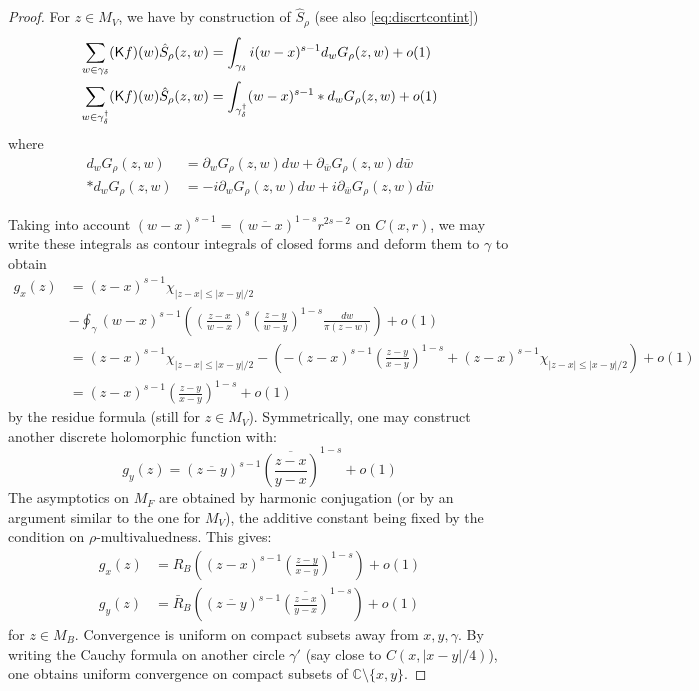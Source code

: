 \documentclass[10pt]{article}
\newcommand{\C}{\mathbb{C}}
\newcommand{\rK}{{\sf K}}
\newcommand{\dg}{\dagger}
\begin{document}
\begin{proof}
For $z\in M_V$, we have by construction of $\hat S_\rho$ (see also \eqref{eq:discrtcontint})
\begin{align*}
\sum_{w\in\gamma_\delta}(\rK f)(w)\hat S_\rho(z,w)
&=\int_{\gamma_\delta}i(w-x)^{s-1}d_wG_\rho(z,w)+o(1)\\
\sum_{w\in\gamma_\delta^\dg}(\rK f)(w)\hat S_\rho(z,w)
&=\int_{\gamma_\delta^\dg}(w-x)^{s-1}\ast d_wG_\rho(z,w)+o(1)
\end{align*}
where
\begin{align*}
d_wG_\rho(z,w)&=\partial_wG_\rho(z,w)dw+\partial_{\bar w}G_\rho(z,w)d\bar w\\
\ast d_wG_\rho(z,w)&=-i\partial_wG_\rho(z,w)dw+i\partial_{\bar w}G_\rho(z,w)d\bar w
\end{align*}

Taking into account $(w-x)^{s-1}=(\overline{w-x})^{1-s}r^{2s-2}$ on $C(x,r)$, we may write these integrals as contour integrals of closed forms and deform them to $\gamma$ to obtain
\begin{align*}
g_x(z)&=(z-x)^{s-1}\chi_{|z-x|\leq|x-y|/2}\\
&-\oint_\gamma (w-x)^{s-1}\left(\left(\frac{z-x}{w-x}\right)^s\left(\frac{z-y}{w-y}\right)^{1-s}\frac{dw}{\pi(z-w)}
%
\right)
+o(1)\\
&=(z-x)^{s-1}\chi_{|z-x|\leq|x-y|/2}-(-(z-x)^{s-1}\left(\frac{z-y}{x-y}\right)^{1-s}+(z-x)^{s-1}\chi_{|z-x|\leq|x-y|/2})+o(1)\\
&=(z-x)^{s-1}\left(\frac{z-y}{x-y}\right)^{1-s}+o(1)
\end{align*}
by the residue formula (still for $z\in M_V$). Symmetrically, one may construct another discrete holomorphic function with:
\begin{equation}\label{eq:Lem:Srho2pts}
g_y(z)=(\overline{z-y})^{s-1}\overline{\left(\frac{z-x}{y-x}\right)}^{1-s}+o(1)
\end{equation}
The asymptotics on $M_F$ are obtained by harmonic conjugation (or by an argument similar to the one for $M_V$), the additive constant being fixed by the condition on $\rho$-multivaluedness. This gives:
\begin{align*}
g_x(z)&=R_B\left((z-x)^{s-1}\left(\frac{z-y}{x-y}\right)^{1-s}\right)+o(1)\\
g_y(z)&=\bar R_B\left((\overline{z-y})^{s-1}\overline{\left(\frac{z-x}{y-x}\right)}^{1-s}\right)+o(1)
\end{align*}
for $z\in M_B$. Convergence is uniform on compact subsets away from $x,y,\gamma$. By writing the Cauchy formula on another circle $\gamma'$ (say close to $C(x,|x-y|/4)$), one obtains uniform convergence on compact subsets of $\C\setminus\{x,y\}$. 


\end{proof}
\end{document}
